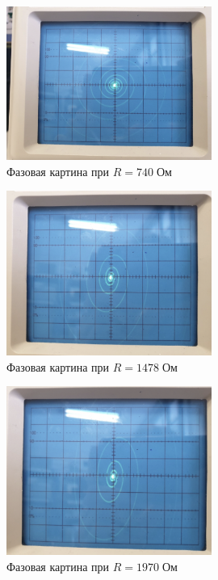 \documentclass[11pt]{article}
\begin{document}
\begin{figure}[H]
    \centering
    \includegraphics[width = 0.6\textwidth]{XY-740.jpg}
    \caption{Фазовая картина при \(R = 740\; Ом \)}
    \label{fig:XY_time}
\end{figure}
\begin{figure}[H]
    \centering
    \includegraphics[width = 0.6\textwidth]{XY-1478.jpg}
    \caption{Фазовая картина при \(R = 1478\; Ом \)}
    \label{fig:XY_time}
\end{figure}
\begin{figure}[H]
    \centering
    \includegraphics[width = 0.6\textwidth]{XY-1970.jpg}
    \caption{Фазовая картина при \(R = 1970\; Ом \)}
    \label{fig:XY_time}
\end{figure}
\end{document}
